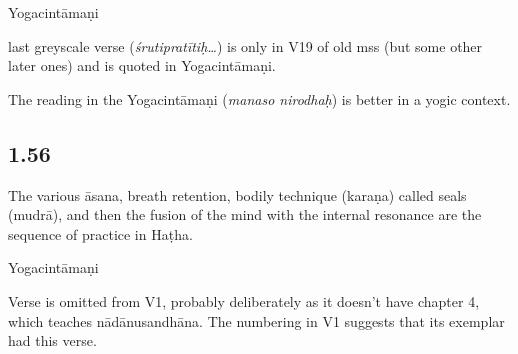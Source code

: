 \begin{ekdosis}
\begin{sources}[hp01_055_4]
\end{sources}

\begin{testimonia}[hp01_055_4]
Yogacintāmaṇi

\begin{versinnote}
\end{versinnote}

\end{testimonia}

\begin{philcomm}[hp01_055_4]
last greyscale verse (\emph{śrutipratītiḥ…}) is only in V19 of old mss (but some other later ones) and is quoted in Yogacintāmaṇi.

The reading in the Yogacintāmaṇi (\emph{manaso nirodhaḥ}) is better in a yogic context.
\end{philcomm}

\subsection*{1.56}
\begin{translation}[hp01_056]
The various āsana, breath retention, bodily technique (karaṇa) called seals (mudrā), and then the fusion of the mind with the internal resonance are the sequence of practice in Haṭha.
\end{translation}

\begin{sources}[hp01_056]
\end{sources}

\begin{testimonia}[hp01_056]
Yogacintāmaṇi

\begin{versinnote}
\end{versinnote}

\end{testimonia}

\begin{philcomm}[hp01_056]
Verse is omitted from V1, probably deliberately as it doesn’t have chapter 4, which teaches nādānusandhāna. The numbering in V1 suggests that its exemplar had this verse.


\end{philcomm}
\end{ekdosis}
